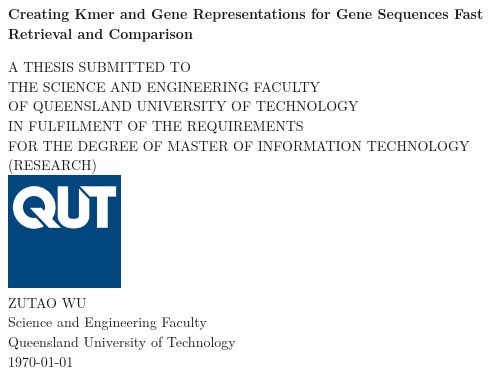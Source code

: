 \begin{center}
    \vspace*{1cm}

    \Large
    \textbf{Creating Kmer and Gene Representations for Gene Sequences Fast Retrieval and Comparison}

    {\normalsize A THESIS SUBMITTED TO}\\
    {\normalsize THE SCIENCE AND ENGINEERING FACULTY}\\
    {\normalsize OF QUEENSLAND UNIVERSITY OF TECHNOLOGY}\\
    {\normalsize IN FULFILMENT OF THE REQUIREMENTS} \\
    {\normalsize FOR THE DEGREE OF MASTER OF INFORMATION TECHNOLOGY (RESEARCH)} \\ [4ex]

    \vfill
    \includegraphics[width = 30mm]{Figs/QUT_LOGO}\\[4ex]
    \vfill
    {\LARGE ZUTAO WU}\\
    {\large Science and Engineering Faculty} \\
    {\large Queensland University of Technology}\\
    {\large \monthyeardate\today}\\

\end{center}
